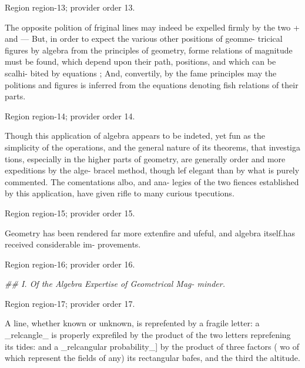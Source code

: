 \documentclass[11pt]{article}
\begin{document}
{\scriptsize\color{gray} Region region-13; provider order 13.\par}
\medskip

The opposite polition of friginal lines may indeed
be expelled firmly by the two + and — But, in
order to expect the various other positions of geomne-
tricical figures by algebra from the principles of geometry, forme relations of magnitude must be found, which
depend upon their path, positions, and which can be scalhi-
bited by equations ; And, convertily, by the fame
principles may the politions and figures is inferred from
the equations denoting fish relations of their parts.
\par

{\scriptsize\color{gray} Region region-14; provider order 14.\par}
\medskip

Though this application of algebra appears to be
indeted, yet fun as the simplicity of the operations,
and the general nature of its theorems, that investiga
tions, especially in the higher parts of geometry, are
generally order and more expeditions by the alge-
bracel method, though lef elegant than by what is
purely commented. The comentations albo, and ana-
legies of the two fiences established by this application, have given rifle to many curious tpecutions.
\par

{\scriptsize\color{gray} Region region-15; provider order 15.\par}
\medskip

Geometry has been rendered far more extenfire and
ufeful, and algebra itself.has received considerable im-
provements.
\par

{\scriptsize\color{gray} Region region-16; provider order 16.\par}
\medskip

{\small\itshape \#\# I. Of the Algebra Expertise of Geometrical Mag-
minder.\par}

{\scriptsize\color{gray} Region region-17; provider order 17.\par}
\medskip

A line, whether known or unknown, is reprefented
by a fragile letter: a \_relcangle\_ is properly exprefiled by
the product of the two letters reprefening its tides:
and a \_relcangular probability\_] by the product of three
factors ( wo of which represent the fields of any) its
rectangular bafes, and the third the altitude.
\par
\end{document}
